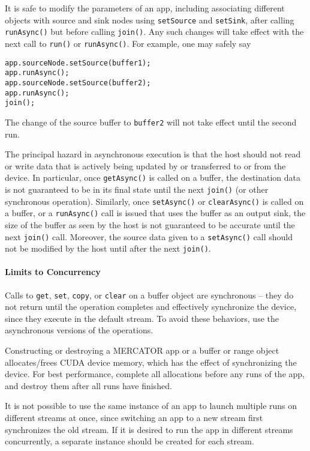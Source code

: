 \documentclass[11pt]{article}
\begin{document}
It is safe to modify the parameters of an app, including associating
different objects with source and sink nodes using \texttt{setSource}
and \texttt{setSink}, after calling \texttt{runAsync()} but before
calling \texttt{join()}.  Any such changes will take effect with the
next call to \texttt{run()} or \texttt{runAsync()}.  For example,
one may safely say
\begin{verbatim}
app.sourceNode.setSource(buffer1);
app.runAsync();
app.sourceNode.setSource(buffer2);
app.runAsync();
join();
\end{verbatim}
The change of the source buffer to \texttt{buffer2} will not take
effect until the second run.

The principal hazard in asynchronous execution is that the host should
not read or write data that is actively being updated by or
transferred to or from the device.  In particular, once
\texttt{getAsync()} is called on a buffer, the destination data is not
guaranteed to be in its final state until the next \texttt{join()} (or
other synchronous operation).  Similarly, once \texttt{setAsync()} or
\texttt{clearAsync()} is called on a buffer, or a \texttt{runAsync()}
call is issued that uses the buffer as an output sink, the size of the
buffer as seen by the host is not guaranteed to be accurate until the
next \texttt{join()} call.  Moreover, the source data given to a
\texttt{setAsync()} call should not be modified by the host until
after the next \texttt{join()}.

\paragraph*{Limits to Concurrency}

Calls to \texttt{get}, \texttt{set}, \texttt{copy}, or \texttt{clear}
on a buffer object are synchronous -- they do not return until the
operation completes and effectively synchronize the device, since they
execute in the default stream.  To avoid these behaviors, use the
asynchronous versions of the operations.
  
Constructing or destroying a MERCATOR app or a buffer or range object
allocates/frees CUDA device memory, which has the effect of
synchronizing the device.  For best performance, complete all
allocations before any runs of the app, and destroy them after all
runs have finished.

It is not possible to use the same instance of an app to launch
multiple runs on different streams at once, since switching an app to
a new stream first synchronizes the old stream.  If it is desired to
run the app in different streams concurrently, a separate instance
should be created for each stream.
\end{document}

